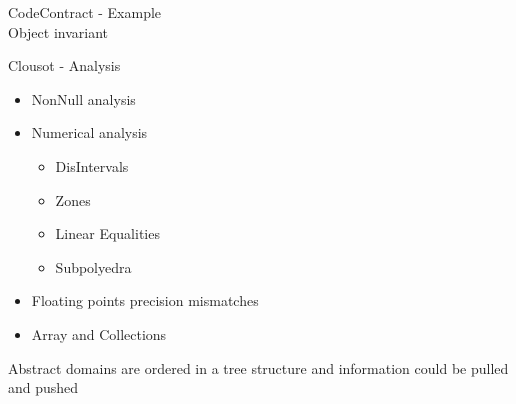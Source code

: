 \begin{frame}[fragile]{CodeContract - Example\\Object invariant}
\vspace*{-0.5cm}

\end{frame}



\begin{frame}{Clousot - Analysis}
\vspace*{-1cm}
\begin{itemize}
  \item NonNull analysis

  \vspace*{0.3cm}

  \item Numerical analysis
  \begin{itemize}
    \item DisIntervals
    \item Zones
    \item Linear Equalities
    \item Subpolyedra
  \end{itemize}

  \vspace*{0.3cm}

  \item Floating points precision mismatches

  \vspace*{0.3cm}

  \item Array and Collections
\end{itemize}

\vspace*{0.8cm}

Abstract domains are ordered in a tree structure and information could be
pulled and pushed

\end{frame}